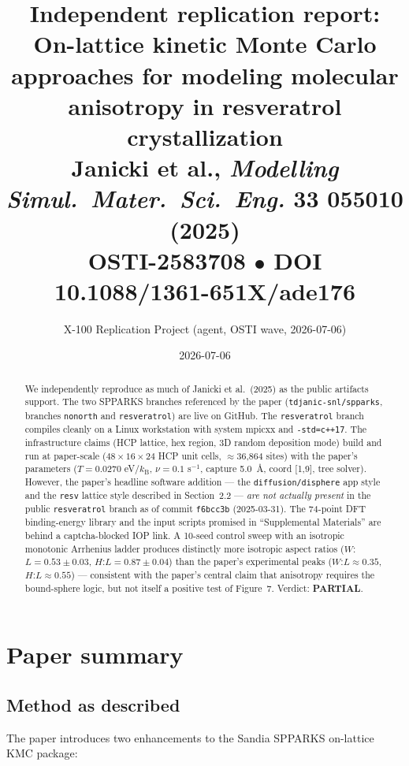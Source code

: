 \documentclass[11pt]{article}
\title{Independent replication report: \\
\textbf{On-lattice kinetic Monte Carlo approaches for modeling molecular anisotropy in resveratrol crystallization} \\
{\small Janicki et al., \emph{Modelling Simul.\ Mater.\ Sci.\ Eng.} \textbf{33} 055010 (2025)} \\
{\small OSTI-2583708 $\bullet$ DOI 10.1088/1361-651X/ade176}}
\author{X-100 Replication Project (agent, OSTI wave, 2026-07-06)}
\date{2026-07-06}
\begin{document}
\maketitle

\begin{abstract}
We independently reproduce as much of Janicki et al.\ (2025) as the public artifacts support. The two SPPARKS branches referenced by the paper (\texttt{tdjanic-snl/spparks}, branches \texttt{nonorth} and \texttt{resveratrol}) are live on GitHub. The \texttt{resveratrol} branch compiles cleanly on a Linux workstation with system mpicxx and \texttt{-std=c++17}. The infrastructure claims (HCP lattice, hex region, 3D random deposition mode) build and run at paper-scale ($48{\times}16{\times}24$ HCP unit cells, $\approx$36{,}864 sites) with the paper's parameters ($T=0.0270$ eV/$k_\text{B}$, $\nu=0.1$ s$^{-1}$, capture 5.0~\AA, coord [1,9], tree solver). However, the paper's headline software addition --- the \texttt{diffusion/disphere} app style and the \texttt{resv} lattice style described in Section~2.2 --- \emph{are not actually present} in the public \texttt{resveratrol} branch as of commit \texttt{f6bcc3b} (2025-03-31). The 74-point DFT binding-energy library and the input scripts promised in ``Supplemental Materials'' are behind a captcha-blocked IOP link. A 10-seed control sweep with an isotropic monotonic Arrhenius ladder produces distinctly more isotropic aspect ratios ($W$:$L=0.53\pm0.03$, $H$:$L=0.87\pm0.04$) than the paper's experimental peaks ($W$:$L\!\approx\!0.35$, $H$:$L\!\approx\!0.55$) --- consistent with the paper's central claim that anisotropy requires the bound-sphere logic, but not itself a positive test of Figure~7. Verdict: \textbf{PARTIAL}.
\end{abstract}

\tableofcontents

\section{Paper summary}

\subsection{Method as described}

The paper introduces two enhancements to the Sandia SPPARKS on-lattice KMC package:
\end{document}
